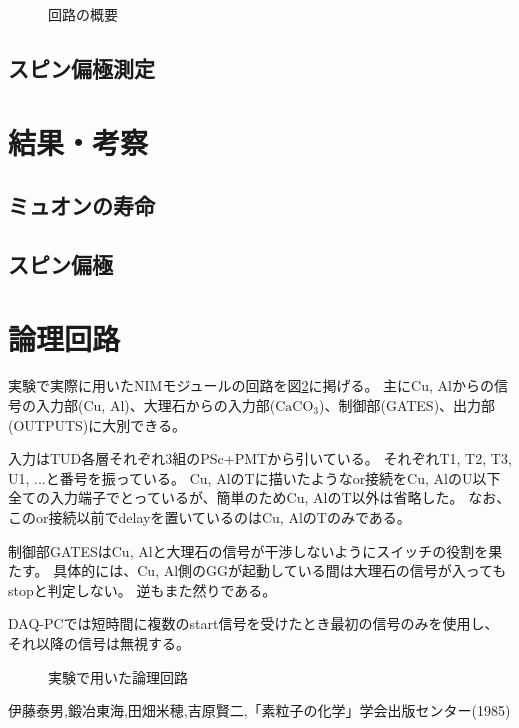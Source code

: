 \documentclass[dvipdfmx]{jsarticle}
\begin{document}
\begin{figure}
    \centering
    
    \caption{回路の概要}
    \label{img: circuit easy}
\end{figure}

\subsection{スピン偏極測定}


\section{結果・考察}
\subsection{ミュオンの寿命}

\subsection{スピン偏極}


\pagebreak



\appendix
\section{論理回路}
実験で実際に用いたNIMモジュールの回路を図\ref{img: full circuit}に掲げる。
主にCu, Alからの信号の入力部(Cu, Al)、大理石からの入力部($\mathrm{CaCO_3}$)、制御部(GATES)、出力部(OUTPUTS)に大別できる。

入力はTUD各層それぞれ3組のPSc+PMTから引いている。
それぞれT1, T2, T3, U1, ...と番号を振っている。
Cu, AlのTに描いたようなor接続をCu, AlのU以下全ての入力端子でとっているが、簡単のためCu, AlのT以外は省略した。
なお、このor接続以前でdelayを置いているのはCu, AlのTのみである。

制御部GATESはCu, Alと大理石の信号が干渉しないようにスイッチの役割を果たす。
具体的には、Cu, Al側のGGが起動している間は大理石の信号が入ってもstopと判定しない。
逆もまた然りである。

DAQ-PCでは短時間に複数のstart信号を受けたとき最初の信号のみを使用し、それ以降の信号は無視する。

\begin{landscape}
    \begin{figure}
        \centering
        
        \caption{実験で用いた論理回路}
        \label{img: full circuit}
    \end{figure}
\end{landscape}

\begin{thebibliography}{10}
     伊藤泰男,鍛冶東海,田畑米穂,吉原賢二,「素粒子の化学」学会出版センター(1985)
\end{thebibliography}
\end{document}
